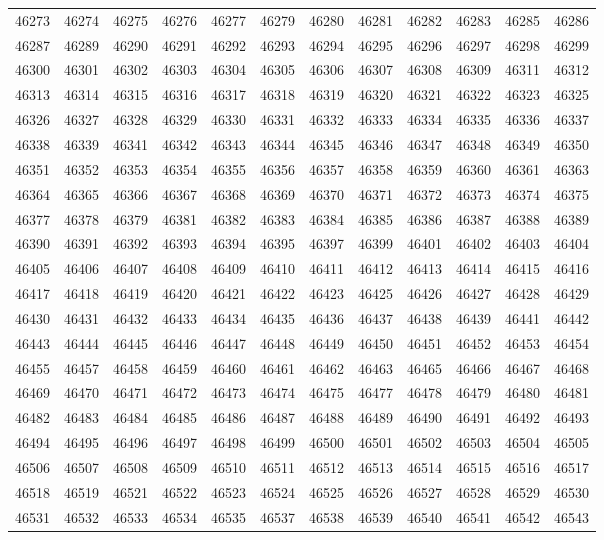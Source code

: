 \begin{center}
\begin{longtable}{llllllllllll}
46273 &46274 &46275 &46276 &46277 &46279 &46280 &46281 &46282 &46283 &46285 &46286 \\
46287 &46289 &46290 &46291 &46292 &46293 &46294 &46295 &46296 &46297 &46298 &46299 \\
46300 &46301 &46302 &46303 &46304 &46305 &46306 &46307 &46308 &46309 &46311 &46312 \\
46313 &46314 &46315 &46316 &46317 &46318 &46319 &46320 &46321 &46322 &46323 &46325 \\
46326 &46327 &46328 &46329 &46330 &46331 &46332 &46333 &46334 &46335 &46336 &46337 \\
46338 &46339 &46341 &46342 &46343 &46344 &46345 &46346 &46347 &46348 &46349 &46350 \\
46351 &46352 &46353 &46354 &46355 &46356 &46357 &46358 &46359 &46360 &46361 &46363 \\
46364 &46365 &46366 &46367 &46368 &46369 &46370 &46371 &46372 &46373 &46374 &46375 \\
46377 &46378 &46379 &46381 &46382 &46383 &46384 &46385 &46386 &46387 &46388 &46389 \\
46390 &46391 &46392 &46393 &46394 &46395 &46397 &46399 &46401 &46402 &46403 &46404 \\
46405 &46406 &46407 &46408 &46409 &46410 &46411 &46412 &46413 &46414 &46415 &46416 \\
46417 &46418 &46419 &46420 &46421 &46422 &46423 &46425 &46426 &46427 &46428 &46429 \\
46430 &46431 &46432 &46433 &46434 &46435 &46436 &46437 &46438 &46439 &46441 &46442 \\
46443 &46444 &46445 &46446 &46447 &46448 &46449 &46450 &46451 &46452 &46453 &46454 \\
46455 &46457 &46458 &46459 &46460 &46461 &46462 &46463 &46465 &46466 &46467 &46468 \\
46469 &46470 &46471 &46472 &46473 &46474 &46475 &46477 &46478 &46479 &46480 &46481 \\
46482 &46483 &46484 &46485 &46486 &46487 &46488 &46489 &46490 &46491 &46492 &46493 \\
46494 &46495 &46496 &46497 &46498 &46499 &46500 &46501 &46502 &46503 &46504 &46505 \\
46506 &46507 &46508 &46509 &46510 &46511 &46512 &46513 &46514 &46515 &46516 &46517 \\
46518 &46519 &46521 &46522 &46523 &46524 &46525 &46526 &46527 &46528 &46529 &46530 \\
46531 &46532 &46533 &46534 &46535 &46537 &46538 &46539 &46540 &46541 &46542 &46543 \\

\end{longtable}
\end{center}
